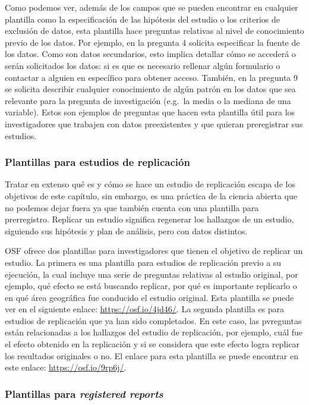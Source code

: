 \documentclass[
  spanish,
  letterpaper,
  DIV=11,
  numbers=noendperiod]{scrreprt}
\begin{document}
Como podemos ver, además de los campos que se pueden encontrar en
cualquier plantilla como la especificación de las hipótesis del estudio
o los criterios de exclusión de datos, esta plantilla hace preguntas
relativas al nivel de conocimiento previo de los datos. Por ejemplo, en
la pregunta 4 solicita especificar la fuente de los datos. Como son
datos secundarios, esto implica detallar cómo se accederá o serán
solicitados los datos: si es que es necesario rellenar algún formulario
o contactar a alguien en específico para obtener acceso. También, en la
pregunta 9 se solicita describir cualquier conocimiento de algún patrón
en los datos que sea relevante para la pregunta de investigación
(e.g.~la media o la mediana de una variable). Estos son ejemplos de
preguntas que hacen esta plantilla útil para los investigadores que
trabajen con datos preexistentes y que quieran preregistrar sus
estudios.

\subsubsection{Plantillas para estudios de
replicación}\label{plantillas-para-estudios-de-replicaciuxf3n}

Tratar en extenso qué es y cómo se hace un estudio de replicación escapa
de los objetivos de este capítulo, sin embargo, es una práctica de la
ciencia abierta que no podemos dejar fuera ya que también cuenta con una
plantilla para prerregistro. Replicar un estudio significa regenerar los
hallazgos de un estudio, siguiendo sus hipótesis y plan de análisis,
pero con datos distintos.

OSF ofrece dos plantillas para investigadores que tienen el objetivo de
replicar un estudio. La primera es una plantilla para estudios de
replicación previo a su ejecución, la cual incluye una serie de
preguntas relativas al estudio original, por ejemplo, qué efecto se está
buscando replicar, por qué es importante replicarlo o en qué área
geográfica fue conducido el estudio original. Esta plantilla se puede
ver en el siguiente enlace: \url{https://osf.io/4jd46/}. La segunda
plantilla es para estudios de replicación que ya han sido completados.
En este caso, las pvreguntas están relacionadas a los hallazgos del
estudio de replicación, por ejemplo, cuál fue el efecto obtenido en la
replicación y si se considera que este efecto logra replicar los
resultados originales o no. El enlace para esta plantilla se puede
encontrar en este enlace: \url{https://osf.io/9rp6j/}.

\subsubsection{\texorpdfstring{Plantillas para \emph{registered
reports}}{Plantillas para registered reports}}\label{plantillas-para-registered-reports}
\end{document}
